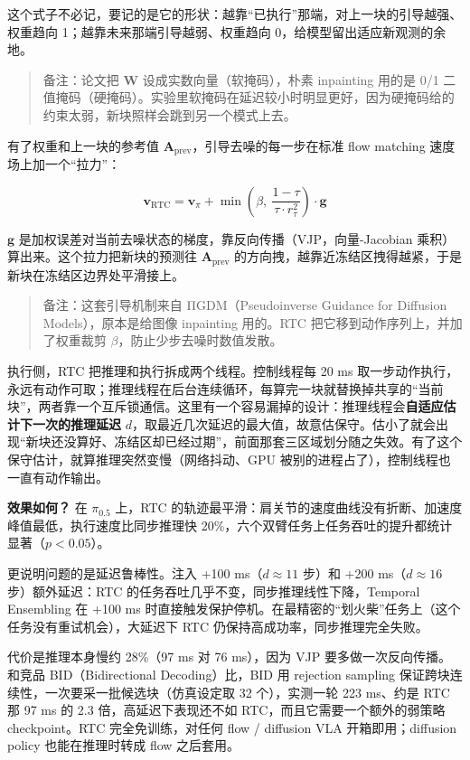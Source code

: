 \documentclass[
  chinese,
]{ctexart}
\begin{document}
这个式子不必记，要记的是它的形状：越靠``已执行''那端，对上一块的引导越强、权重趋向
1；越靠未来那端引导越弱、权重趋向 0，给模型留出适应新观测的余地。

\begin{quote}
备注：论文把 \(\mathbf{W}\) 设成实数向量（软掩码），朴素 inpainting
用的是 0/1
二值掩码（硬掩码）。实验里软掩码在延迟较小时明显更好，因为硬掩码给的约束太弱，新块照样会跳到另一个模式上去。
\end{quote}

有了权重和上一块的参考值
\(\mathbf{A}_\text{prev}\)，引导去噪的每一步在标准 flow matching
速度场上加一个``拉力''：

\[\mathbf{v}_\text{RTC} = \mathbf{v}_\pi + \min\!\left(\beta,\ \frac{1-\tau}{\tau \cdot r^2_\tau}\right) \cdot \mathbf{g}\]

\(\mathbf{g}\)
是加权误差对当前去噪状态的梯度，靠反向传播（VJP，向量-Jacobian
乘积）算出来。这个拉力把新块的预测往 \(\mathbf{A}_\text{prev}\)
的方向拽，越靠近冻结区拽得越紧，于是新块在冻结区边界处平滑接上。

\begin{quote}
备注：这套引导机制来自 ΠGDM（Pseudoinverse Guidance for Diffusion
Models），原本是给图像 inpainting 用的。RTC
把它移到动作序列上，并加了权重裁剪 \(\beta\)，防止少步去噪时数值发散。
\end{quote}

执行侧，RTC 把推理和执行拆成两个线程。控制线程每 20 ms
取一步动作执行，永远有动作可取；推理线程在后台连续循环，每算完一块就替换掉共享的``当前块''，两者靠一个互斥锁通信。这里有一个容易漏掉的设计：推理线程会\textbf{自适应估计下一次的推理延迟}
\(d\)，取最近几次延迟的最大值，故意估保守。估小了就会出现``新块还没算好、冻结区却已经过期''，前面那套三区域划分随之失效。有了这个保守估计，就算推理突然变慢（网络抖动、GPU
被别的进程占了），控制线程也一直有动作输出。

\textbf{效果如何？} 在 \(\pi_{0.5}\) 上，RTC
的轨迹最平滑：肩关节的速度曲线没有折断、加速度峰值最低，执行速度比同步推理快
20\%，六个双臂任务上任务吞吐的提升都统计显著（\(p < 0.05\)）。

更说明问题的是延迟鲁棒性。注入 +100 ms（\(d \approx 11\) 步）和 +200
ms（\(d \approx 16\) 步）额外延迟：RTC
的任务吞吐几乎不变，同步推理线性下降，Temporal Ensembling 在 +100 ms
时直接触发保护停机。在最精密的``划火柴''任务上（这个任务没有重试机会），大延迟下
RTC 仍保持高成功率，同步推理完全失败。

代价是推理本身慢约 28\%（97 ms 对 76 ms），因为 VJP
要多做一次反向传播。和竞品 BID（Bidirectional Decoding）比，BID 用
rejection sampling 保证跨块连续性，一次要采一批候选块（仿真设定取 32
个），实测一轮 223 ms、约是 RTC 那 97 ms 的 2.3 倍，高延迟下表现还不如
RTC，而且它需要一个额外的弱策略 checkpoint。RTC 完全免训练，对任何 flow
/ diffusion VLA 开箱即用；diffusion policy 也能在推理时转成 flow
之后套用。
\end{document}
